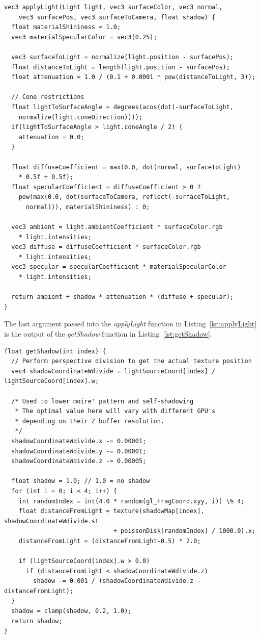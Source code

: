 \documentclass[a4paper,12pt]{article}
\begin{document}
\begin{lstlisting}[label=lst:applyLight,caption= Shader function for applying lighting]
vec3 applyLight(Light light, vec3 surfaceColor, vec3 normal,
    vec3 surfacePos, vec3 surfaceToCamera, float shadow) {
  float materialShininess = 1.0;
  vec3 materialSpecularColor = vec3(0.25);

  vec3 surfaceToLight = normalize(light.position - surfacePos);
  float distanceToLight = length(light.position - surfacePos);
  float attenuation = 1.0 / (0.1 + 0.0001 * pow(distanceToLight, 3));

  // Cone restrictions
  float lightToSurfaceAngle = degrees(acos(dot(-surfaceToLight,
    normalize(light.coneDirection))));
  if(lightToSurfaceAngle > light.coneAngle / 2) {
    attenuation = 0.0;
  }

  float diffuseCoefficient = max(0.0, dot(normal, surfaceToLight)
    * 0.5f + 0.5f);
  float specularCoefficient = diffuseCoefficient > 0 ?
    pow(max(0.0, dot(surfaceToCamera, reflect(-surfaceToLight,
      normal))), materialShininess) : 0;

  vec3 ambient = light.ambientCoefficient * surfaceColor.rgb
    * light.intensities;
  vec3 diffuse = diffuseCoefficient * surfaceColor.rgb
    * light.intensities;
  vec3 specular = specularCoefficient * materialSpecularColor
    * light.intensities;

  return ambient + shadow * attenuation * (diffuse + specular);
}
\end{lstlisting}

The last argument passed into the \emph{applyLight} function in Listing~\ref{lst:applyLight} is the output of the \emph{getShadow} function in Listing~\ref{lst:getShadow}.

\begin{minipage}{\textwidth}
\begin{lstlisting}[label=lst:getShadow,caption= The shader function figuring out whether the fragment is in the shade.]
float getShadow(int index) {
  // Perform perspective division to get the actual texture position
  vec4 shadowCoordinateWdivide = lightSourceCoord[index] / lightSourceCoord[index].w;

  /* Used to lower moire' pattern and self-shadowing
   * The optimal value here will vary with different GPU's
   * depending on their Z buffer resolution.
   */
  shadowCoordinateWdivide.x -= 0.00001;
  shadowCoordinateWdivide.y -= 0.00001;
  shadowCoordinateWdivide.z -= 0.00005;

  float shadow = 1.0; // 1.0 = no shadow
  for (int i = 0; i < 4; i++) {
    int randomIndex = int(4.0 * random(gl_FragCoord.xyy, i)) \% 4;
    float distanceFromLight = texture(shadowMap[index], shadowCoordinateWdivide.st
                              + poissonDisk[randomIndex] / 1000.0).x;
    distanceFromLight = (distanceFromLight-0.5) * 2.0;

    if (lightSourceCoord[index].w > 0.0)
      if (distanceFromLight < shadowCoordinateWdivide.z)
        shadow -= 0.001 / (shadowCoordinateWdivide.z - distanceFromLight);
  }
  shadow = clamp(shadow, 0.2, 1.0);
  return shadow;
}
\end{lstlisting}
\end{minipage}
\end{document}
